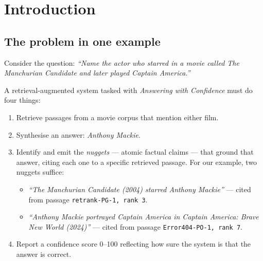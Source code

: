 \documentclass[11pt,a4paper]{article}
\newcommand{\HMR}{\textsc{HMR}}
\begin{document}
\begin{abstract}
\textbf{We validate our self-evaluator against the official judge: a Claude
Sonnet 4.6 judge (Opus 4.7 cross-validated) predicted the official \HMR{} of
our two main runs to within 0.0004}, which both anchors the internal
ablations in this paper and offers evidence that a carefully-specified LLM
self-evaluator can track the official R2C2 methodology. Headline numbers are
official organiser scores (65 topics, 64 scored); per-stage ablations use
the validated self-evaluator where noted.
\end{abstract}

\section{Introduction}

\subsection{The problem in one example}

Consider the question: \emph{``Name the actor who starred in a movie called
The Manchurian Candidate and later played Captain America.''}

A retrieval-augmented system tasked with \emph{Answering with Confidence}
must do four things:

\begin{enumerate}[leftmargin=*, itemsep=0.2em]
  \item Retrieve passages from a movie corpus that mention either film.
  \item Synthesise an answer: \emph{Anthony Mackie}.
  \item Identify and emit the \emph{nuggets} — atomic factual claims —
    that ground that answer, citing each one to a specific retrieved
    passage. For our example, two nuggets suffice:
    \begin{itemize}
      \item \emph{``The Manchurian Candidate (2004) starred Anthony Mackie''} —
        cited from passage \texttt{retrank-PG-1, rank 3}.
      \item \emph{``Anthony Mackie portrayed Captain America in
        Captain America: Brave New World (2024)''} — cited from passage
        \texttt{Error404-PO-1, rank 7}.
    \end{itemize}
  \item Report a confidence score 0–100 reflecting how sure the system
    is that the answer is correct.
\end{enumerate}
\end{document}
